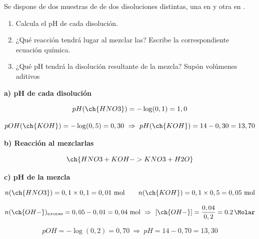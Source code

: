 \begin{exerciseEVAU}
    Se dispone de dos muestras de   de dos disoluciones distintas, una   en  y otra  en .
    \begin{enumerate}[label=\letraminuscula]
        \item Calcula el pH de cada disolución.
        \item ¿Qué reacción tendrá lugar al mezclar las? Escribe la correspondiente ecuación química.
        \item ¿Qué pH tendrá la disolución resultante de la mezcla? Supón volúmenes aditivos
    \end{enumerate}

    \begin{solu}


        \textbf{a) pH de cada disolución}

        \begin{equation*}
            pH(\ch{HNO3}) = -\log(0,1) = 1,0
        \end{equation*}

        \begin{equation*}
            pOH(\ch{KOH}) = -\log(0,5) = 0,30 \ \Rightarrow \ pH(\ch{KOH}) = 14-0,30 = 13,70
        \end{equation*}

        \textbf{b) Reacción al mezclarlas}

        \begin{equation*}
            \ch{HNO3 + KOH -> KNO3 + H2O}
        \end{equation*}

        \textbf{c) pH de la mezcla}

        \begin{equation*}
            n(\ch{HNO3}) = 0,1\times0,1 = 0,01 \ \text{mol} \qquad n(\ch{KOH}) = 0,1\times0,5 = 0,05 \ \text{mol}
        \end{equation*}

        \begin{equation*}
            n(\ch{OH-})_{exceso} = 0,05-0,01 = 0,04 \ \text{mol} \ \Rightarrow \ [\ch{OH-}] = \dfrac{0,04}{0,2} = \SI{0.2}{\Molar}
        \end{equation*}

        \begin{equation*}
            pOH = -\log(0,2) = 0,70 \ \Rightarrow \ pH = 14-0,70 = 13,30
        \end{equation*}

    \end{solu}
\end{exerciseEVAU}

